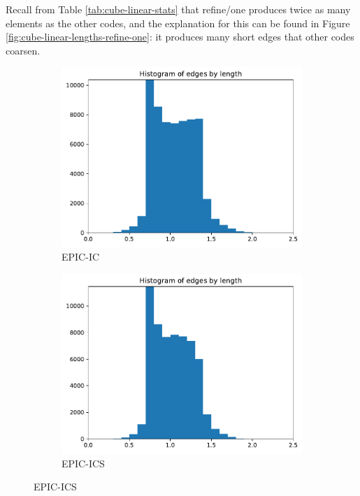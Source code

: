 \documentclass[3p,times,procedia,number]{elsarticle}
\begin{document}
Recall from Table \ref{tab:cube-linear-stats} that refine/one produces
twice as many elements as the other codes, and the explanation for this can be
found in Figure \ref{fig:cube-linear-lengths-refine-one}:
it produces many short edges that other codes coarsen.

\begin{figure}
\begin{subfigure}{.16\textwidth}
\centering
\includegraphics[width=\textwidth]{epic-ic-cube-linear-length.pdf}
\caption{EPIC-IC}
\end{subfigure}
\begin{subfigure}{.16\textwidth}
\centering
\includegraphics[width=\textwidth]{epic-ics-cube-linear-length.pdf}
\caption{EPIC-ICS}

\end{subfigure}
\end{figure}
\end{document}
